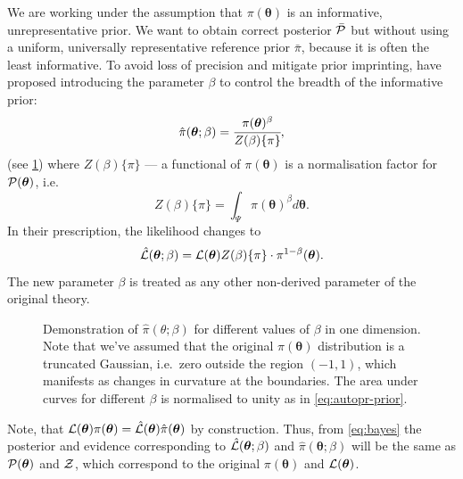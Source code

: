 \documentclass[usenatbib]{mnras}
\begin{document}
We are working under the assumption that $\pi(\bm{\theta})$ is an
informative, unrepresentative prior. We want to obtain correct
posterior $\bar{\cal P}$ but without using a uniform, universally
representative reference prior $\bar{\pi}$, because it is often the
least informative. To avoid loss of precision and mitigate prior
imprinting, \cite{chen-ferroz-hobson} have proposed introducing the
parameter \(\beta\) to control the breadth of the informative prior:
\begin{equation}
  \label{eq:autopr-prior}
  \hat{\pi}(\bm{\bm{\theta}};\beta) = \cfrac{\pi(\bm{\theta})^{\beta}}{Z(\beta)\{\pi\}},
\end{equation}
(see \cref{fig:ppr}) where \(Z(\beta)\{\pi\}\) --- a functional of
\(\pi (\bm{\theta})\) is a normalisation factor for
\( {\cal P} (\bm{\theta})\), i.e.
\begin{equation}
  Z(\beta)\{\pi\} = \int_{\Psi} \pi(\bm{\bm{\theta}})^{\beta}d\bm{\bm{\theta}}.
\end{equation}
In their prescription, the likelihood changes to
\begin{equation}
  \hat{\cal L}(\bm{\theta}; \beta) = {\cal L}(\bm{\theta}) Z(\beta)\{\pi\} \cdot \pi^{1-\beta}(\bm{\theta}).
\end{equation}
The new parameter $\beta$ is treated as any other non-derived
parameter of the original theory.

\begin{figure}
 
 \caption{\label{fig:ppr} Demonstration of
   \(\hat{\pi}(\theta; \beta)\) for different values of \(\beta\) in
   one dimension. Note that we've assumed that the original
   \( \pi (\bm{\theta})\) distribution is a truncated Gaussian,
   i.e.~zero outside the region \((-1, 1)\), which manifests as
   changes in curvature at the boundaries. The area under curves for
   different $\beta$ is normalised to unity as in
   \cref{eq:autopr-prior}. }
\end{figure}

Note, that
\({\cal L}(\bm{\theta})\pi (\bm{\theta}) = \hat{\cal L}(\bm{\theta})
\hat{\pi} (\bm{\theta})\) by construction. Thus, from \cref{eq:bayes}
the posterior and evidence corresponding to
\(\hat{\cal L}(\bm{\theta};\beta)\) and
\(\hat{\pi} (\bm{\theta};\beta)\) will be the same as
\( {\cal P} (\bm{\theta})\) and \({\cal Z}\), which correspond to the
original $\pi(\bm{\theta})$ and ${\cal L}(\bm{\theta})$.
\end{document}
